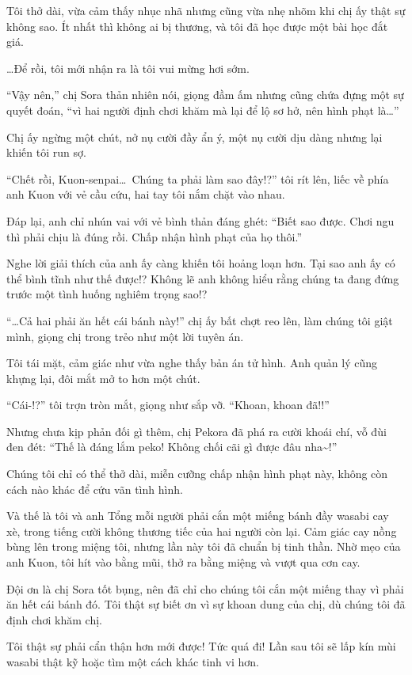 \documentclass[../main.tex]{subfiles}
\begin{document}
Tôi thở dài, vừa cảm thấy nhục nhã nhưng cũng vừa nhẹ nhõm khi chị ấy thật sự không sao. Ít nhất thì không ai bị thương, và tôi đã học được một bài học đắt giá.

\dots Để rồi, tôi mới nhận ra là tôi vui mừng hơi sớm.

``Vậy nên,'' chị Sora thản nhiên nói, giọng đầm ấm nhưng cũng chứa đựng một sự quyết đoán, ``vì hai người định chơi khăm mà lại để lộ sơ hở, nên hình phạt là\dots''

Chị ấy ngừng một chút, nở nụ cười đầy ẩn ý, một nụ cười dịu dàng nhưng lại khiến tôi run sợ.

``Chết rồi, Kuon-senpai\dots\ Chúng ta phải làm sao đây!?'' tôi rít lên, liếc về phía anh Kuon với vẻ cầu cứu, hai tay tôi nắm chặt vào nhau.

Đáp lại, anh chỉ nhún vai với vẻ bình thản đáng ghét: ``Biết sao được. Chơi ngu thì phải chịu là đúng rồi. Chấp nhận hình phạt của họ thôi.''

Nghe lời giải thích của anh ấy càng khiến tôi hoảng loạn hơn. Tại sao anh ấy có thể bình tĩnh như thế được!? Không lẽ anh không hiểu rằng chúng ta đang đứng trước một tình huống nghiêm trọng sao!?

``\dots Cả hai phải ăn hết cái bánh này!'' chị ấy bất chợt reo lên, làm chúng tôi giật mình, giọng chị trong trẻo như một lời tuyên án.

Tôi tái mặt, cảm giác như vừa nghe thấy bản án tử hình. Anh quản lý cũng khựng lại, đôi mắt mở to hơn một chút.

``Cái-!?'' tôi trợn tròn mắt, giọng như sắp vỡ. ``Khoan, khoan đã!!''

Nhưng chưa kịp phản đối gì thêm, chị Pekora đã phá ra cười khoái chí, vỗ đùi đen đét: ``Thế là đáng lắm peko! Không chối cãi gì được đâu nha\~{}!''

Chúng tôi chỉ có thể thở dài, miễn cưỡng chấp nhận hình phạt này, không còn cách nào khác để cứu vãn tình hình.

Và thế là tôi và anh Tổng mỗi người phải cắn một miếng bánh đầy wasabi cay xè, trong tiếng cười không thương tiếc của hai người còn lại. Cảm giác cay nồng bùng lên trong miệng tôi, nhưng lần này tôi đã chuẩn bị tinh thần. Nhờ mẹo của anh Kuon, tôi hít vào bằng mũi, thở ra bằng miệng và vượt qua cơn cay.

Đội ơn là chị Sora tốt bụng, nên đã chỉ cho chúng tôi cắn một miếng thay vì phải ăn hết cái bánh đó. Tôi thật sự biết ơn vì sự khoan dung của chị, dù chúng tôi đã định chơi khăm chị.

Tôi thật sự phải cẩn thận hơn mới được! Tức quá đi! Lần sau tôi sẽ lấp kín mùi wasabi thật kỹ hoặc tìm một cách khác tinh vi hơn.
\end{document}
